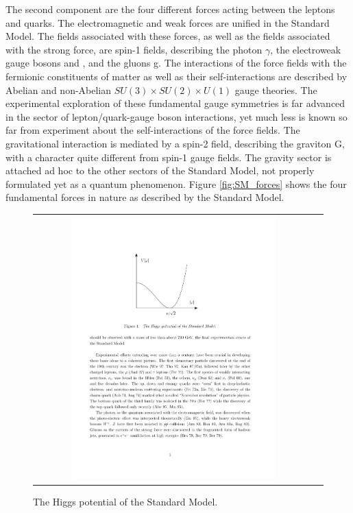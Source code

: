 The second component are the four different forces acting between the leptons and quarks. The electromagnetic and weak forces are unified in the Standard Model. The fields associated with these forces, as well as the fields associated with the strong force, are spin-1 fields, describing the photon \ensuremath{\gamma}, the electroweak gauge bosons \W and \Z, and the gluons g. The interactions of the force fields with the fermionic constituents of matter as well as their self-interactions are described by Abelian and non-Abelian \ensuremath{SU(3) \times SU(2) \times U(1)} gauge theories. The experimental exploration of these fundamental gauge symmetries is far advanced in the sector of lepton/quark-gauge boson interactions, yet much less is known so far from experiment about the self-interactions of the force fields. The gravitational interaction is mediated by a spin-2 field, describing the graviton G, with a character quite different from spin-1 gauge fields. The gravity sector is attached ad hoc to the other sectors of the Standard Model, not properly formulated yet as a quantum phenomenon. Figure \ref{fig:SM_forces} shows the four fundamental forces in nature as described by the Standard Model.



\begin{figure}[tbh!]
	\centering
	\begin{tabular}{cc}
		\includegraphics[width=0.75\textwidth]{theory/pics/higgs_potential.pdf}
	\end{tabular}
	\caption{The Higgs potential of the Standard Model.}
	\label{fig:higgs_potential}
\end{figure}


